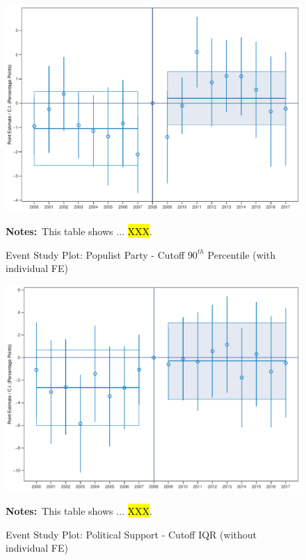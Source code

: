 \documentclass[11pt]{article}
\begin{document}
\begin{figure}[htbp!]
    \centering
    \caption{Event Study Plot: Populist Party - Cutoff $90^{th}$ Percentile (with individual FE)}\label{fig:dynamic_did_cbk_past_mean_pp_p90_ife}
    \includegraphics[width=1\linewidth]{events/dynamic_did_cbk_past_mean_pp_p90_ife}
    \begin{tablenotes}
        \footnotesize
        \item \textbf{Notes:}~This table shows ... \hl{XXX}.
    \end{tablenotes} 
\end{figure}

\begin{figure}[htbp!]
    \centering
    \caption{Event Study Plot: Political Support - Cutoff IQR (without individual FE)}\label{fig:dynamic_did_cbk_past_mean_ps_iqr_noife}
    \includegraphics[width=1\linewidth]{events/dynamic_did_cbk_past_mean_ps_iqr_noife}
    \begin{tablenotes}
        \footnotesize
        \item \textbf{Notes:}~This table shows ... \hl{XXX}.
    \end{tablenotes} 
\end{figure}
\end{document}
